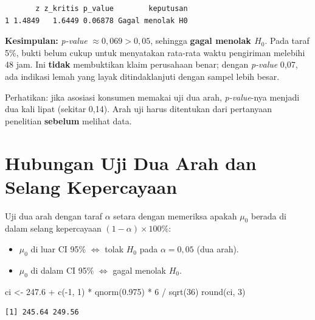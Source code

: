 \documentclass[
  indonesian,
  letterpaper,
]{book}
\newenvironment{Shaded}{\begin{snugshade}}{\end{snugshade}}
\newcommand{\DecValTok}[1]{\textcolor[rgb]{0.68,0.00,0.00}{#1}}
\newcommand{\FloatTok}[1]{\textcolor[rgb]{0.68,0.00,0.00}{#1}}
\newcommand{\FunctionTok}[1]{\textcolor[rgb]{0.28,0.35,0.67}{#1}}
\newcommand{\NormalTok}[1]{\textcolor[rgb]{0.00,0.23,0.31}{#1}}
\newcommand{\OtherTok}[1]{\textcolor[rgb]{0.00,0.23,0.31}{#1}}
\newcommand{\SpecialCharTok}[1]{\textcolor[rgb]{0.37,0.37,0.37}{#1}}
\providecommand{\tightlist}{%
  \setlength{\itemsep}{0pt}\setlength{\parskip}{0pt}}
\begin{document}
\begin{verbatim}
       z z_kritis p_value        keputusan
1 1.4849   1.6449 0.06878 Gagal menolak H0
\end{verbatim}

\textbf{Kesimpulan:} \emph{p-value} \(\approx 0{,}069 > 0{,}05\),
sehingga \textbf{gagal menolak \(H_0\)}. Pada taraf 5\%, bukti belum
cukup untuk menyatakan rata-rata waktu pengiriman melebihi 48 jam. Ini
\textbf{tidak} membuktikan klaim perusahaan benar; dengan \emph{p-value}
0,07, ada indikasi lemah yang layak ditindaklanjuti dengan sampel lebih
besar.

Perhatikan: jika asosiasi konsumen memakai uji dua arah,
\emph{p-value}-nya menjadi dua kali lipat (sekitar 0,14). Arah uji harus
ditentukan dari pertanyaan penelitian \textbf{sebelum} melihat data.


\chapter{Hubungan Uji Dua Arah dan Selang
Kepercayaan}\label{hubungan-uji-dua-arah-dan-selang-kepercayaan}

Uji dua arah dengan taraf \(\alpha\) setara dengan memeriksa apakah
\(\mu_0\) berada di dalam selang kepercayaan
\((1-\alpha) \times 100\%\):

\begin{itemize}
\tightlist
\item
  \(\mu_0\) di luar CI 95\% \(\iff\) tolak \(H_0\) pada
  \(\alpha = 0{,}05\) (dua arah).
\item
  \(\mu_0\) di dalam CI 95\% \(\iff\) gagal menolak \(H_0\).
\end{itemize}

\begin{Shaded}
\begin{Highlighting}[]
\NormalTok{ci }\OtherTok{\textless{}{-}} \FloatTok{247.6} \SpecialCharTok{+} \FunctionTok{c}\NormalTok{(}\SpecialCharTok{{-}}\DecValTok{1}\NormalTok{, }\DecValTok{1}\NormalTok{) }\SpecialCharTok{*} \FunctionTok{qnorm}\NormalTok{(}\FloatTok{0.975}\NormalTok{) }\SpecialCharTok{*} \DecValTok{6} \SpecialCharTok{/} \FunctionTok{sqrt}\NormalTok{(}\DecValTok{36}\NormalTok{)}
\FunctionTok{round}\NormalTok{(ci, }\DecValTok{3}\NormalTok{)}
\end{Highlighting}
\end{Shaded}

\begin{verbatim}
[1] 245.64 249.56
\end{verbatim}
\end{document}
